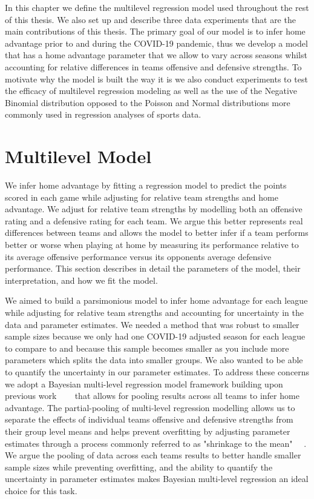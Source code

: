In this chapter we define the multilevel regression model used throughout the rest of this thesis. We also set up and describe three data experiments that are the main contributions of this thesis. The primary goal of our model is to infer home advantage prior to and during the COVID-19 pandemic, thus we develop a model that has a home advantage parameter that we allow to vary across seasons whilst accounting for relative differences in teams offensive and defensive strengths. To motivate why the model is built the way it is we also conduct experiments to test the efficacy of multilevel regression modeling as well as the use of the Negative Binomial distribution opposed to the Poisson and Normal distributions more commonly used in regression analyses of sports data.

\section{Multilevel Model} \label{multilevel_model}

We infer home advantage by fitting a regression model to predict the points scored in each game while adjusting for relative team strengths and home advantage. We adjust for relative team strengths by modelling both an offensive rating and a defensive rating for each team. We argue this better represents real differences between teams and allows the model to better infer if a team performs better or worse when playing at home by measuring its performance relative to its average offensive performance versus its opponents average defensive performance. This section describes in detail the parameters of the model, their interpretation, and how we fit the model.

We aimed to build a parsimonious model to infer home advantage for each league while adjusting for relative team strengths and accounting for uncertainty in the data and parameter estimates. We needed a method that was robust to smaller sample sizes because we only had one COVID-19 adjusted season for each league to compare to and because this sample becomes smaller as you include more parameters which splits the data into smaller groups. We also wanted to be able to quantify the uncertainty in our parameter estimates. To address these concerns we adopt a Bayesian multi-level regression model framework building upon previous work \mbox{\cite{Baio2010} \cite{Glickman1998} \cite{Lopez2018} \cite{Benz2020}} that allows for pooling results across all teams to infer home advantage. The partial-pooling of multi-level regression modelling allows us to separate the effects of individual teams offensive and defensive strengths from their group level means and helps prevent overfitting by adjusting parameter estimates through a process commonly referred to as "shrinkage to the mean" \mbox{\cite{Gelman2014} \cite{Gelman2006} \cite{McElreath2020}}. We argue the pooling of data across each teams results to better handle smaller sample sizes while preventing overfitting, and the ability to quantify the uncertainty in parameter estimates makes Bayesian multi-level regression an ideal choice for this task.

